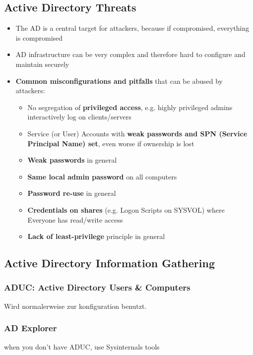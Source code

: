 \subsection{Active Directory Threats}
\begin{itemize}
    \item The AD is a central target for attackers, because if compromised, everything is compromised
    \item AD infrastructure can be very complex and therefore hard to configure and maintain securely
    \item \textbf{Common misconfigurations and pitfalls} that can be abused by attackers:
    \begin{itemize}
        \item No segregation of \textbf{privileged access}, e.g. highly privileged admins interactively log on clients/servers
        \item Service (or User) Accounts with \textbf{weak passwords and SPN (Service Principal Name) set}, even worse if ownership is lost
        \item \textbf{Weak passwords} in general
        \item \textbf{Same local admin password} on all computers
        \item \textbf{Password re-use} in general
        \item \textbf{Credentials on shares} (e.g. Logon Scripts on SYSVOL) where Everyone has read/write access
        \item \textbf{Lack of least-privilege} principle in general
    \end{itemize}
\end{itemize}

\subsection{Active Directory Information Gathering}

\subsubsection{ADUC: Active Directory Users \& Computers}
Wird normalerweise zur konfiguration benutzt.

\subsubsection{AD Explorer}
when you don't have ADUC, use Sysinternals tools

